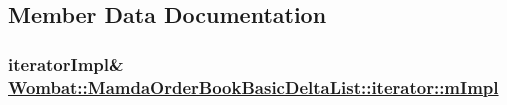 \subsection{Member Data Documentation}
\hypertarget{classWombat_1_1MamdaOrderBookBasicDeltaList_1_1iterator_ec4987702ce908e50f7596133cb0b080}{
\subsubsection[mImpl]{\setlength{\rightskip}{0pt plus 5cm}iterator\-Impl\& \hyperlink{classWombat_1_1MamdaOrderBookBasicDeltaList_1_1iterator_ec4987702ce908e50f7596133cb0b080}{Wombat::Mamda\-Order\-Book\-Basic\-Delta\-List::iterator::m\-Impl}}}
\label{classWombat_1_1MamdaOrderBookBasicDeltaList_1_1iterator_ec4987702ce908e50f7596133cb0b080}


